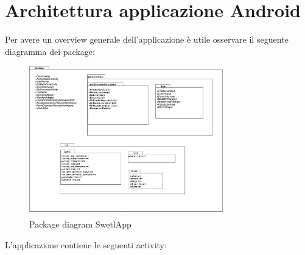 \clearpage
\section{Architettura applicazione Android}

Per avere un overview generale dell'applicazione è utile osservare il seguente diagramma dei package: 

\begin{figure}[H]
	\begin{center}
		\includegraphics[width=0.75\textwidth, keepaspectratio]{../includes/pics/package_diagram.png}
		\caption{Package diagram SwetlApp}
	\end{center}
\end{figure}

L'applicazione contiene le seguenti activity:


